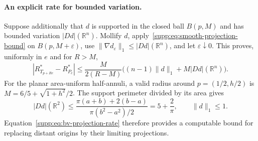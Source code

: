 \paragraph{An explicit rate for bounded variation.}
Suppose additionally that $d$ is supported in the closed ball $B(p,M)$ and has bounded variation $|Dd|(\mathbb R^n)$. Mollify $d$, apply~\eqref{supp:eq:smooth-projection-bound} on $B(p,M+\varepsilon)$, use $\|\nabla d_\varepsilon\|_1\leq|Dd|(\mathbb R^n)$, and let $\varepsilon\downarrow0$. This proves, uniformly in $e$ and for $R>M$,
\begin{equation}
 \left|R^*_{T_{p+Re}}-R^*_{P_e}\right|
 \leq\frac{M}{2(R-M)}
 \bigl((n-1)\|d\|_1+M|Dd|(\mathbb R^n)\bigr).
 \label{supp:eq:bv-projection-rate}
\end{equation}
For the planar area-uniform half-annuli, a valid radius around $p=(1/2,h/2)$ is $M=6/5+\sqrt{1+h^2}/2$. The support perimeter divided by its area gives
\[
 |Dd|(\mathbb R^2)\leq
 \frac{\pi(a+b)+2(b-a)}{\pi(b^2-a^2)/2}
 =5+\frac2\pi,
 \qquad \|d\|_1\leq1.
\]
Equation~\eqref{supp:eq:bv-projection-rate} therefore provides a computable bound for replacing distant origins by their limiting projections.
